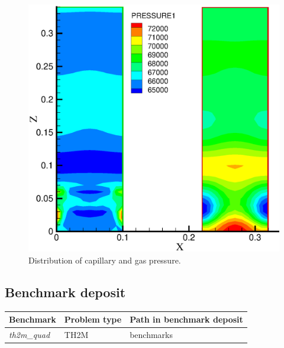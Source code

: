 \begin{figure}[!thb]
\begin{center}
\includegraphics[scale=0.4]{TH2M/figure/pre.eps}
\end{center}
\caption{Distribution of capillary and gas pressure.}
 \label{fig:th2m_pre}
\end{figure}
\subsection*{Benchmark deposit}
\begin{tabular}{|l|l|l|}
  \hline
  Benchmark & Problem type & Path in benchmark deposit \\
  \hline
 \emph{th2m\_quad}& TH2M & benchmarks\verb \TH2M\ \\
  \hline
\end{tabular}


